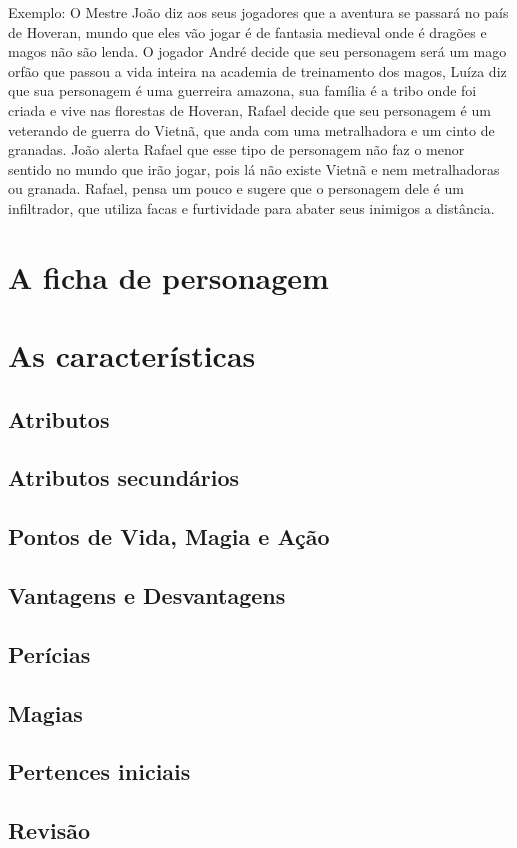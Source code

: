 Exemplo: O Mestre João diz aos seus jogadores que a aventura se passará no país de Hoveran, mundo que eles vão jogar é de fantasia medieval onde é dragões e magos não são lenda. O jogador André decide que seu personagem será um mago orfão que passou a vida inteira na academia de treinamento dos magos, Luíza diz que sua personagem é uma guerreira amazona, sua família é a tribo onde foi criada e vive nas florestas de Hoveran, Rafael decide que seu personagem é um veterando de guerra do Vietnã, que anda com uma metralhadora e um cinto de granadas. João alerta Rafael que esse tipo de personagem não faz o menor sentido no mundo que irão jogar, pois lá não existe Vietnã e nem metralhadoras ou granada. Rafael, pensa um pouco e sugere que o personagem dele é um infiltrador, que utiliza facas e furtividade para abater seus inimigos a distância.

\section{A ficha de personagem}

\section{As características}

\subsection{Atributos}

\subsection{Atributos secundários}

\subsection{Pontos de Vida, Magia e Ação}

\subsection{Vantagens e Desvantagens}

\subsection{Perícias}

\subsection{Magias}

\subsection{Pertences iniciais}

\subsection{Revisão}




